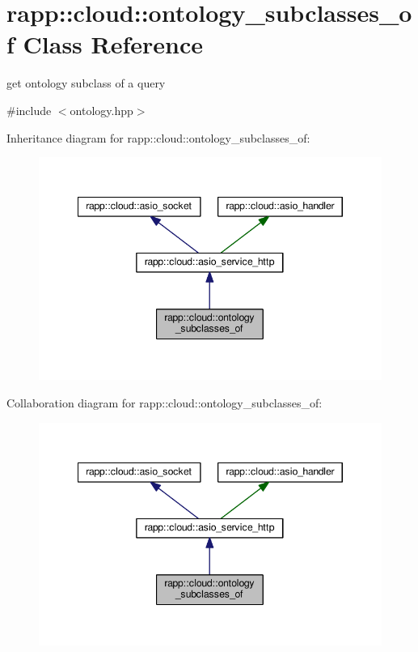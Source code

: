 \hypertarget{classrapp_1_1cloud_1_1ontology__subclasses__of}{\section{rapp\-:\-:cloud\-:\-:ontology\-\_\-subclasses\-\_\-of Class Reference}
\label{classrapp_1_1cloud_1_1ontology__subclasses__of}
}


get ontology subclass of a query  




{\ttfamily \#include $<$ontology.\-hpp$>$}



Inheritance diagram for rapp\-:\-:cloud\-:\-:ontology\-\_\-subclasses\-\_\-of\-:
\nopagebreak
\begin{figure}[H]
\begin{center}
\leavevmode
\includegraphics[width=345pt]{classrapp_1_1cloud_1_1ontology__subclasses__of__inherit__graph}
\end{center}
\end{figure}


Collaboration diagram for rapp\-:\-:cloud\-:\-:ontology\-\_\-subclasses\-\_\-of\-:
\nopagebreak
\begin{figure}[H]
\begin{center}
\leavevmode
\includegraphics[width=345pt]{classrapp_1_1cloud_1_1ontology__subclasses__of__coll__graph}
\end{center}
\end{figure}
